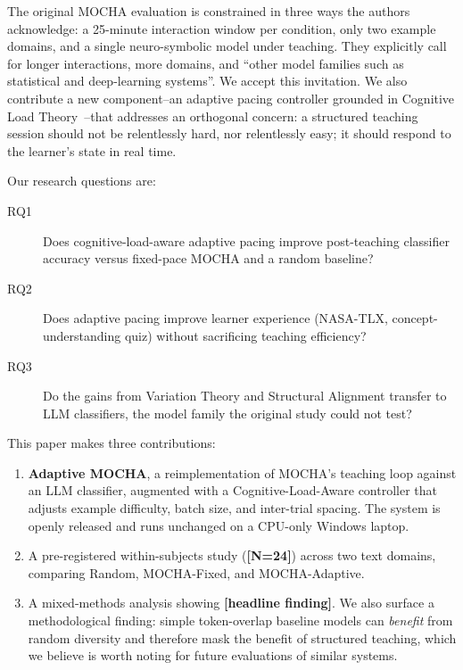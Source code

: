 \documentclass[sigchi, anonymous=true, review=true]{acmart}
\newcommand{\chiplaceholder}[1]{{\color{red}\textbf{[#1]}}}
\begin{document}
The original MOCHA evaluation is constrained in three ways the authors
acknowledge: a 25-minute interaction window per condition, only two example
domains, and a single neuro-symbolic model under teaching. They explicitly
call for longer interactions, more domains, and ``other model families such
as statistical and deep-learning systems''. We accept this invitation. We
also contribute a new component--an adaptive pacing controller grounded in
Cognitive Load Theory~\cite{sweller1988cognitive}--that addresses an
orthogonal concern: a structured teaching session should not be
relentlessly hard, nor relentlessly easy; it should respond to the learner's
state in real time.

Our research questions are:
\begin{description}
  \item[RQ1] Does cognitive-load-aware adaptive pacing improve post-teaching
    classifier accuracy versus fixed-pace MOCHA and a random baseline?
  \item[RQ2] Does adaptive pacing improve learner experience (NASA-TLX,
    concept-understanding quiz) without sacrificing teaching efficiency?
  \item[RQ3] Do the gains from Variation Theory and Structural Alignment
    transfer to LLM classifiers, the model family the original study could
    not test?
\end{description}

This paper makes three contributions:

\begin{enumerate}
  \item \textbf{Adaptive MOCHA}, a reimplementation of MOCHA's teaching loop
    against an LLM classifier, augmented with a Cognitive-Load-Aware
    controller that adjusts example difficulty, batch size, and inter-trial
    spacing. The system is openly released and runs unchanged on a CPU-only
    Windows laptop.
  \item A pre-registered within-subjects study (\chiplaceholder{N=24}) across
    two text domains, comparing Random, MOCHA-Fixed, and MOCHA-Adaptive.
  \item A mixed-methods analysis showing
    \chiplaceholder{headline finding}. We also surface a methodological
    finding: simple token-overlap baseline models can \emph{benefit} from
    random diversity and therefore mask the benefit of structured teaching,
    which we believe is worth noting for future evaluations of similar
    systems.
\end{enumerate}
\end{document}
